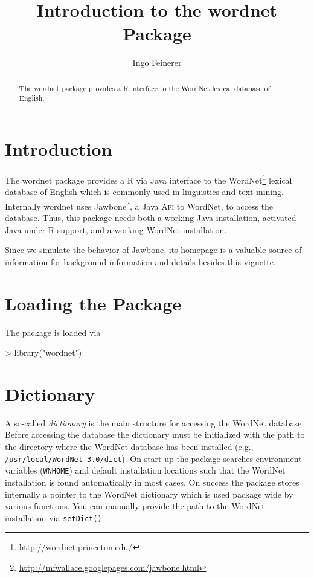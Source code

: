 \documentclass[a4paper]{article}
\newcommand{\strong}[1]{{\normalfont\fontseries{b}\selectfont #1}}
\newcommand{\code}[1]{\mbox{\texttt{#1}}}
\newcommand{\pkg}[1]{\strong{#1}}
\newcommand{\proglang}[1]{\textsf{#1}}
\newcommand{\acronym}[1]{\textsc{#1}}
\begin{document}
\title{Introduction to the \pkg{wordnet} Package}
\author{Ingo Feinerer}
\maketitle
\sloppy

\begin{abstract}
  The \pkg{wordnet} package provides a \proglang{R} interface to the
  \proglang{WordNet} lexical database of English.
\end{abstract}

\section*{Introduction}
The \pkg{wordnet} package provides a \proglang{R} via \proglang{Java}
interface to the
\proglang{WordNet}\footnote{\url{http://wordnet.princeton.edu/}}
lexical database of English which is commonly used in linguistics and
text mining. Internally \pkg{wordnet} uses
\proglang{Jawbone}\footnote{\url{http://mfwallace.googlepages.com/jawbone.html}},
a \proglang{Java} \acronym{Api} to \proglang{WordNet}, to access the
database. Thus, this package needs both a working \proglang{Java}
installation, activated \proglang{Java} under \proglang{R} support, and a
working \proglang{WordNet} installation.

Since we simulate the behavior of \proglang{Jawbone}, its homepage
is a valuable source of information for background information and
details besides this vignette.

\section*{Loading the Package}
The package is loaded via
\begin{Schunk}
\begin{Sinput}
> library("wordnet")
\end{Sinput}
\end{Schunk}

\section*{Dictionary}
A so-called \emph{dictionary} is the main structure for accessing the
\proglang{WordNet} database. Before accessing the database the
dictionary must be initialized with the path to the directory where
the \proglang{WordNet} database has been installed (e.g.,
\code{/usr/local/WordNet-3.0/dict}). On start up the package
searches environment variables (\code{WNHOME}) and default
installation locations such that the WordNet installation is found
automatically in most cases. On success the package stores internally
a pointer to the WordNet dictionary which is used package wide by
various functions. You can manually provide the path to the WordNet
installation via \code{setDict()}.
\end{document}
